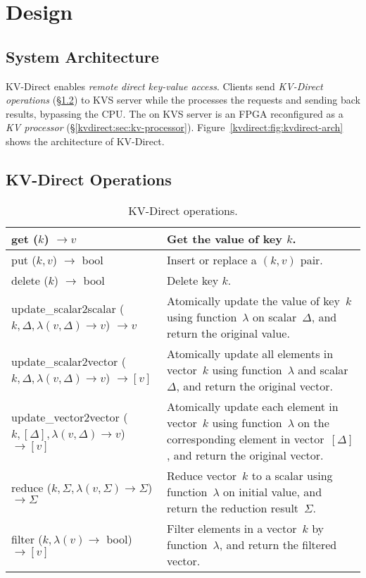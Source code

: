 \section{Design}
\label{kvdirect:sec:architecture}

\subsection{System Architecture}

KV-Direct enables \textit{remote direct key-value access}.
Clients send \textit{KV-Direct operations} (\S\ref{kvdirect:sec:kv-operations}) to KVS server while the \ournic{} processes the requests and sending back results, bypassing the CPU.
The \ournic{} on KVS server is an FPGA reconfigured as a \textit{KV processor} (\S\ref{kvdirect:sec:kv-processor}).
Figure~\ref{kvdirect:fig:kvdirect-arch} shows the architecture of KV-Direct.

\subsection{KV-Direct Operations}
\label{kvdirect:sec:kv-operations}

\begin{table}
\centering
\caption{KV-Direct operations.}
\label{kvdirect:tab:kv-operations}

\small
\begin{tabular}{p{}|p{} }
\toprule
get ($k$) $\rightarrow v$ & Get the value of key $k$. \\
\midrule
put ($k, v$) $\rightarrow$ bool & Insert or replace a $(k, v)$ pair. \\
\midrule
delete ($k$) $\rightarrow$ bool & Delete key $k$. \\
\midrule
\midrule
update{\_}scalar2scalar ($k, \Delta, \lambda(v, \Delta) \rightarrow v$) $\rightarrow v$ & Atomically update the value of key~$k$ using function~$\lambda$ on scalar~$\Delta$, and return the original value. \\
\midrule
update{\_}scalar2vector ($k, \Delta, \lambda(v, \Delta) \rightarrow v$) $\rightarrow [v]$ & Atomically update all elements in vector~$k$ using function~$\lambda$ and scalar~$\Delta$, and return the original vector. \\
\midrule
update{\_}vector2vector ($k, [\Delta], \lambda(v, \Delta) \rightarrow v$) $\rightarrow [v]$ & Atomically update each element in vector~$k$ using function~$\lambda$ on the corresponding element in vector~$[\Delta]$, and return the original vector. \\
\midrule
reduce ($k, \Sigma, \lambda(v, \Sigma) \rightarrow \Sigma$) $\rightarrow \Sigma$ & Reduce vector~$k$ to a scalar using function~$\lambda$ on initial value, and return the reduction result~$\Sigma$. \\
\midrule
filter ($k, \lambda(v) \rightarrow$ bool) $\rightarrow [v]$ & Filter elements in a vector~$k$ by function~$\lambda$, and return the filtered vector. \\
\bottomrule
\end{tabular}

\end{table}

